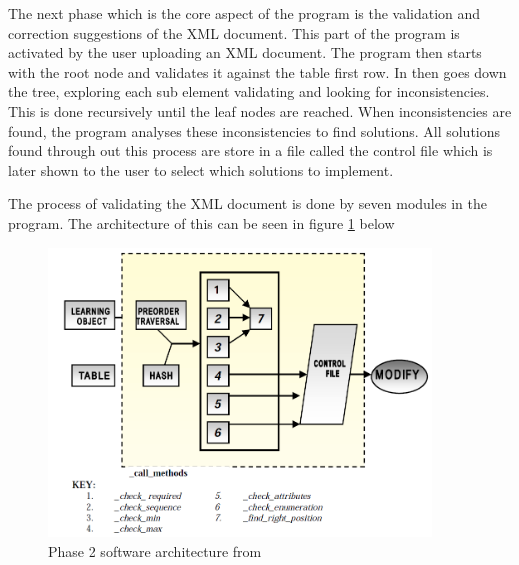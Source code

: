 \documentclass{report}
\begin{document}
The next phase which is the core aspect of the program is the validation and correction suggestions of the XML document. This part of the program is activated by the user uploading an XML document. The program then starts with the root node and validates it against the table first row. In then goes down the tree, exploring each sub element validating and looking for inconsistencies. This is done recursively until the leaf nodes are reached. When inconsistencies are found, the program analyses these inconsistencies to find solutions. All solutions found through out this process are store in a file called the control file which is later shown to the user to select which solutions to implement.

The process of validating the XML document is done by seven modules in the program. The architecture of this can be seen in figure \ref{fig:phase2arch} below
\begin{figure}[H]
\centering
\includegraphics[width=4in]{phase2arch.png}%
\caption{Phase 2 software architecture from \cite{shivadas2001intelligent}}%
\label{fig:phase2arch}%
\end{figure}
\end{document}
